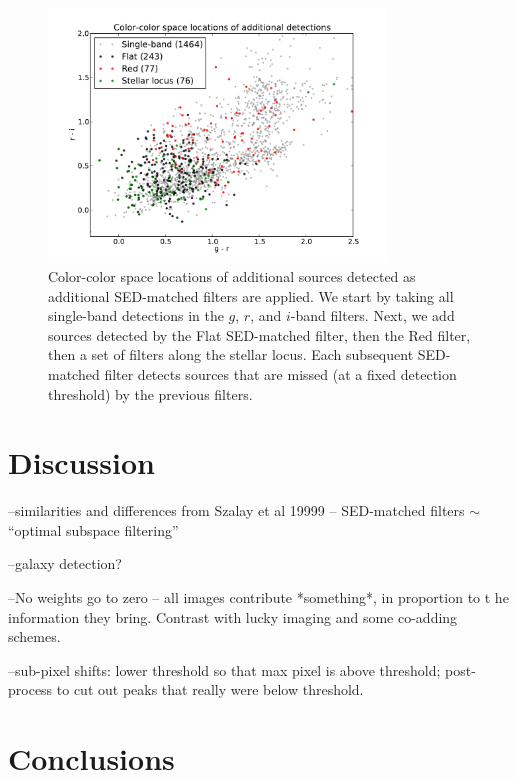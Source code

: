 \documentclass[letterpaper,preprint]{aastex62}
\begin{document}
\begin{figure}
\begin{center}
\includegraphics[width=0.8\textwidth]{mdetect-18}
\caption{Color-color space locations of additional sources detected as
  additional SED-matched filters are applied.  We start by taking all
  single-band detections in the $g$, $r$, and $i$-band filters.  Next,
  we add sources detected by the Flat SED-matched filter, then the Red
  filter, then a set of filters along the stellar locus.  Each
  subsequent SED-matched filter detects sources that are missed (at a
  fixed detection threshold) by the previous filters.
  \label{fig:added}}
\end{center}
\end{figure}


\section{Discussion}

--similarities and differences from Szalay et al 19999 -- SED-matched
filters $\sim$ ``optimal subspace filtering''

--galaxy detection?

--No weights go to zero -- all images contribute *something*, in
proportion to t he information they bring.  Contrast with lucky
imaging and some co-adding schemes.

--sub-pixel shifts: lower threshold so that max pixel is above
threshold; post-process to cut out peaks that really were below
threshold.


\section{Conclusions}
\end{document}
